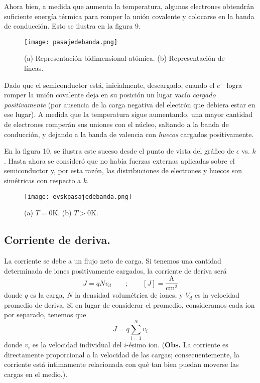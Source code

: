\documentclass[12pt,a4paper]{article}
\begin{document}
Ahora bien, a medida que aumenta la temperatura, algunos electrones obtendrán suficiente energía térmica para romper la unión covalente y colocarse en la banda de conducción. Esto se ilustra en la figura 9.

\begin{figure}[ht!]
\begin{center}
\texttt{[image: pasajedebanda.png]}
\caption{(a) Representación bidimensional atómica. (b) Representación de líneas.}
\end{center}
\end{figure}

Dado que el semiconductor está, inicialmente, descargado, cuando el $e^{-}$ logra romper la unión covalente deja en su posición un lugar vacío \emph{cargado positivamente} (por ausencia de la carga negativa del electrón que debiera estar en ese lugar). A medida que la temperatura sigue aumentando, una mayor cantidad de electrones romperán sus uniones con el núcleo, saltando a la banda de conducción, y dejando a la banda de valencia con \emph{huecos} cargados positivamente.

En la figura 10, se ilustra este suceso desde el punto de vista del gráfico de $\epsilon$ vs. $k$. Hasta ahora se consideró que no había fuerzas externas aplicadas sobre el semiconductor y, por esta razón, las distribuciones de electrones y huecos son simétricas con respecto a $k$.

\begin{figure}[ht!]
\begin{center}
\texttt{[image: evskpasajedebanda.png]}
\caption{(a) $T=0$K. (b) $T>0$K.}
\end{center}
\end{figure}

\subsection{Corriente de deriva.}

La corriente se debe a un flujo neto de carga. Si tenemos una cantidad determinada de iones positivamente cargados, la corriente de deriva será
\[ J=qNv_{d} \qquad ; \qquad [ J ] = \frac{\textrm{A}}{\textrm{cm}^{2}} \]
donde $q$ es la carga, $N$ la densidad volumétrica de iones, y $V_{d}$ es la velocidad promedio de deriva. Si en lugar de considerar el promedio, consideramos cada ion por separado, tenemos que
\[ J= q \sum _{i=1}^{N} v_{i} \]
donde $v_{i}$ es la velocidad individual del $i$-ésimo ion. (\textbf{Obs.} La corriente es directamente proporcional a la velocidad de las cargas; consecuentemente, la corriente está íntimamente relacionada con qué tan bien puedan moverse las cargas en el medio.).
\end{document}
